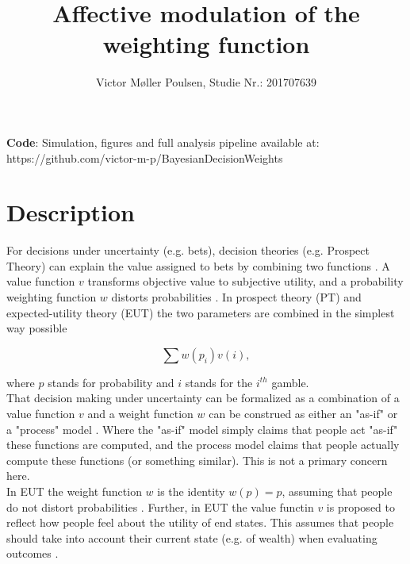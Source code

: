 \documentclass[12pt]{article}
\title{Affective modulation of the weighting function}
\author{Victor Møller Poulsen, Studie Nr.: 201707639}
\begin{document}
\maketitle
\leavevmode

\textbf{Code}: Simulation, figures and
full analysis pipeline available at: \\
https://github.com/victor-m-p/BayesianDecisionWeights


\section{Description}

For decisions under uncertainty
(e.g. bets), decision theories
(e.g. Prospect Theory) can explain the
value assigned to bets by combining two functions
\autocite{rottenstreich2001money}.
A value function $v$ transforms objective value to
subjective utility, and a probability
weighting function $w$
distorts probabilities \autocite{rottenstreich2001money,
gonzalez1999shape}.
In prospect theory (PT)
and expected-utility theory (EUT) the two parameters
are combined in
the simplest way possible
\autocite{rottenstreich2001money}

\[
	\sum w(p_i)v(i),
\]

where $p$ stands for probability and $i$ stands for the
$i^{th}$ gamble. \\

That decision making under uncertainty can
be formalized as a combination of a value
function $v$ and a weight function  $w$
can be construed
as either an "as-if" or a "process" model
\autocite{newell2015straight}. Where the
"as-if" model simply claims that people act
"as-if" these functions are computed, and the
process model claims that people actually compute
these functions (or something similar). This
is not a primary concern here. \\

In EUT the weight function $w$
is the identity $w(p) = p$, assuming that people do
not distort probabilities \autocite{rottenstreich2001money}.
Further, in EUT the value functin $v$ is
proposed to reflect how people feel about
the utility of end states. This assumes that people should
take into account their current state (e.g. of wealth)
when evaluating outcomes
\autocite{newell2015straight}.

\vspace{3mm}
\end{document}
